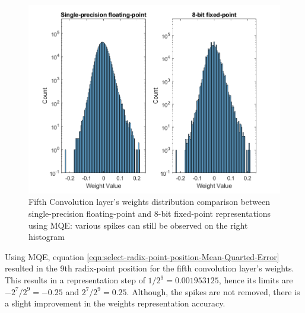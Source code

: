 \begin{figure} [H]
	\centering
	\includegraphics[scale=0.9]{Images/Weights-distributions/original-vs-fixed8/weight-distribution-conv5-MQE.png}
	\decoRule
	\caption[Fifth Convolution layer's weights distribution comparison between single-precision floating-point and 8-bit fixed-point representations using MQE]{Fifth Convolution layer's weights distribution comparison between single-precision floating-point and 8-bit fixed-point representations using MQE: various spikes can still be observed on the right histogram}
	\label{fig:weight-distribution-comparison-conv5-MQE}
\end{figure}

Using MQE, equation \ref{eqn:select-radix-point-position-Mean-Quarted-Error} resulted in the 9th radix-point position for the fifth convolution layer's weights. This results in a representation step of $1/2^9 = 0.001953125$, hence its limits are $-2^7/2^9 = -0.25$ and $2^7/2^9 = 0.25$. Although, the spikes are not removed, there is a slight improvement in the weights representation accuracy.

